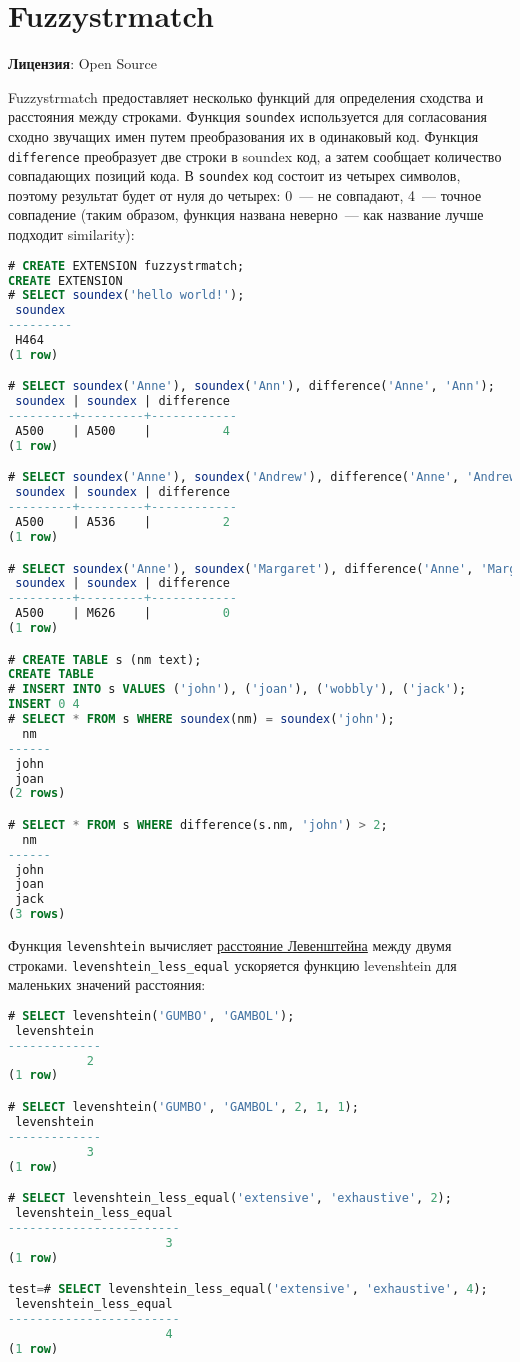 \section{Fuzzystrmatch}
\textbf{Лицензия}: Open Source

Fuzzystrmatch предоставляет несколько функций для определения сходства и расстояния между строками. Функция \lstinline!soundex! используется для согласования сходно звучащих имен путем преобразования их в одинаковый код. Функция \lstinline!difference! преобразует две строки в soundex код, а затем сообщает количество совпадающих позиций кода. В \lstinline!soundex! код состоит из четырех символов, поэтому результат будет от нуля до четырех: 0~--- не совпадают, 4~--- точное совпадение (таким образом, функция названа неверно~--- как название лучше подходит similarity):

\begin{lstlisting}[language=SQL,label=lst:ext_fuzzystrmatch1,caption=soundex]
# CREATE EXTENSION fuzzystrmatch;
CREATE EXTENSION
# SELECT soundex('hello world!');
 soundex
---------
 H464
(1 row)

# SELECT soundex('Anne'), soundex('Ann'), difference('Anne', 'Ann');
 soundex | soundex | difference
---------+---------+------------
 A500    | A500    |          4
(1 row)

# SELECT soundex('Anne'), soundex('Andrew'), difference('Anne', 'Andrew');
 soundex | soundex | difference
---------+---------+------------
 A500    | A536    |          2
(1 row)

# SELECT soundex('Anne'), soundex('Margaret'), difference('Anne', 'Margaret');
 soundex | soundex | difference
---------+---------+------------
 A500    | M626    |          0
(1 row)

# CREATE TABLE s (nm text);
CREATE TABLE
# INSERT INTO s VALUES ('john'), ('joan'), ('wobbly'), ('jack');
INSERT 0 4
# SELECT * FROM s WHERE soundex(nm) = soundex('john');
  nm
------
 john
 joan
(2 rows)

# SELECT * FROM s WHERE difference(s.nm, 'john') > 2;
  nm
------
 john
 joan
 jack
(3 rows)
\end{lstlisting}

Функция \lstinline!levenshtein! вычисляет \href{http://en.wikipedia.org/wiki/Levenshtein\_distance}{расстояние Левенштейна} между двумя строками. \lstinline!levenshtein_less_equal! ускоряется функцию levenshtein для маленьких значений расстояния:

\begin{lstlisting}[language=SQL,label=lst:ext_fuzzystrmatch2,caption=levenshtein]
# SELECT levenshtein('GUMBO', 'GAMBOL');
 levenshtein
-------------
           2
(1 row)

# SELECT levenshtein('GUMBO', 'GAMBOL', 2, 1, 1);
 levenshtein
-------------
           3
(1 row)

# SELECT levenshtein_less_equal('extensive', 'exhaustive', 2);
 levenshtein_less_equal
------------------------
                      3
(1 row)

test=# SELECT levenshtein_less_equal('extensive', 'exhaustive', 4);
 levenshtein_less_equal
------------------------
                      4
(1 row)
\end{lstlisting}

